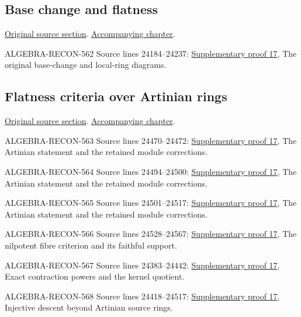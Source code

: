\subsection{Base change and flatness}
\hypertarget{algebra-source-section-base-change-flat}{}
\noindent\href{https://github.com/stacks/stacks-project/blob/a04446e57ec1fbc252a871afcec7752fb2807b14/algebra.tex\#L24177}{Original source section}. \href{algebra.pdf\#nameddest=section-base-change-flat}{Accompanying chapter}.

\begin{AlgebraSourceRoutes}
\item[ALGEBRA-RECON-562] Source lines 24184--24237: \hyperlink{algebra_nilpotent_flatness_notes_20260928}{Supplementary proof 17}, The original base-change and local-ring diagrams.
\end{AlgebraSourceRoutes}

\subsection{Flatness criteria over Artinian rings}
\hypertarget{algebra-source-section-flatness-artinian}{}
\noindent\href{https://github.com/stacks/stacks-project/blob/a04446e57ec1fbc252a871afcec7752fb2807b14/algebra.tex\#L24286}{Original source section}. \href{algebra.pdf\#nameddest=section-flatness-artinian}{Accompanying chapter}.

\begin{AlgebraSourceRoutes}
\item[ALGEBRA-RECON-563] Source lines 24470--24472: \hyperlink{algebra_nilpotent_flatness_notes_20260928}{Supplementary proof 17}, The Artinian statement and the retained module corrections.
\item[ALGEBRA-RECON-564] Source lines 24494--24500: \hyperlink{algebra_nilpotent_flatness_notes_20260928}{Supplementary proof 17}, The Artinian statement and the retained module corrections.
\item[ALGEBRA-RECON-565] Source lines 24501--24517: \hyperlink{algebra_nilpotent_flatness_notes_20260928}{Supplementary proof 17}, The Artinian statement and the retained module corrections.
\item[ALGEBRA-RECON-566] Source lines 24528--24567: \hyperlink{algebra_nilpotent_flatness_notes_20260928}{Supplementary proof 17}, The nilpotent fibre criterion and its faithful support.
\item[ALGEBRA-RECON-567] Source lines 24383--24442: \hyperlink{algebra_nilpotent_flatness_notes_20260928}{Supplementary proof 17}, Exact contraction powers and the kernel quotient.
\item[ALGEBRA-RECON-568] Source lines 24418--24517: \hyperlink{algebra_nilpotent_flatness_notes_20260928}{Supplementary proof 17}, Injective descent beyond Artinian source rings.
\end{AlgebraSourceRoutes}

